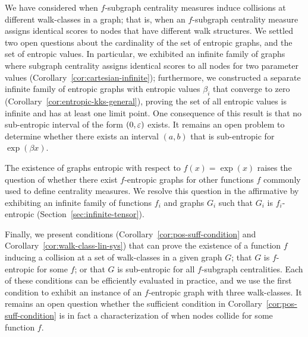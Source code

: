 We have considered when $f$-subgraph centrality measures induce collisions at different walk-classes in a graph; that is, when an $f$-subgraph centrality measure assigns identical scores to nodes that have different walk structures.
We settled two open questions about the cardinality of the set of entropic graphs, and the set of entropic values.
In particular, we exhibited an infinite family of graphs where subgraph centrality assigns identical scores to all nodes for two parameter values (Corollary~\ref{cor:cartesian-infinite});
furthermore, we constructed a separate infinite family of entropic graphs with entropic values $\beta_i$ that converge to zero (Corollary~\ref{cor:entropic-kks-general}), proving the set of all entropic values is infinite and has at least one limit point.
One consequence of this result is that no sub-entropic interval of the form $(0,\varepsilon)$ exists.
It remains an open problem to determine whether there exists an interval $(a,b)$ that is sub-entropic for $\exp(\beta x)$.

The existence of graphs entropic with respect to $f(x) = \exp(x)$ raises the question of whether there exist $f$-entropic graphs for other functions $f$ commonly used to define centrality measures.
We resolve this question in the affirmative by exhibiting an infinite family of functions $f_i$ and graphs $G_i$ such that $G_i$ is $f_i$-entropic (Section~\ref{sec:infinite-tensor}).

Finally, we present conditions (Corollary~\ref{cor:pos-suff-condition} and Corollary~\ref{cor:walk-class-lin-sys}) that can prove the existence of a function $f$ inducing a collision at a set of walk-classes in a given graph $G$; that $G$ is $f$-entropic for some $f$; or that $G$ is sub-entropic for all $f$-subgraph centralities.
Each of these conditions can be efficiently evaluated in practice, and we use the first condition to exhibit an instance of an $f$-entropic graph with three walk-classes.
It remains an open question whether the sufficient condition in Corollary~\ref{cor:pos-suff-condition} is in fact a characterization of when nodes collide for some function $f$.
